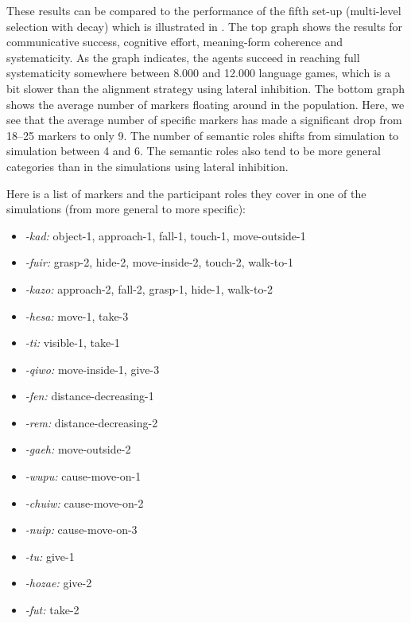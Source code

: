 These results can be compared to the performance of the fifth set-up (multi-level selection with decay) which is illustrated in . The top graph shows the results for communicative success, cognitive effort, meaning-form coherence and systematicity. As the graph indicates, the agents succeed in reaching full systematicity somewhere between 8.000 and 12.000 language games, which is a bit slower than the alignment strategy using lateral inhibition. The bottom graph shows the average number of markers floating around in the population. Here, we see that the average number of specific markers has made a significant drop from 18--25 markers to only 9. The number of semantic roles shifts from simulation to simulation between 4 and 6. The semantic roles also tend to be more general categories than in the simulations using lateral inhibition.


Here is a list of markers and the participant roles they cover in one of the simulations (from more general to more specific):

\begin{itemize}
\item {\em -kad:} object-1, approach-1, fall-1, touch-1, move-outside-1
\item {\em -fuir:}  grasp-2, hide-2, move-inside-2, touch-2, walk-to-1
\item {\em -kazo:} approach-2, fall-2, grasp-1, hide-1, walk-to-2
\item {\em -hesa:} move-1, take-3
\item {\em -ti:} visible-1, take-1
\item {\em -qiwo:} move-inside-1, give-3
\item {\em -fen:} distance-decreasing-1
\item {\em -rem:} distance-decreasing-2
\item {\em -gaeh:} move-outside-2
\largerpage
\item {\em -wupu:} cause-move-on-1
\item {\em -chuiw:} cause-move-on-2
\item {\em -nuip:} cause-move-on-3
\item {\em -tu:} give-1
\item {\em -hozae:} give-2
\item {\em -fut:} take-2
\end{itemize}

